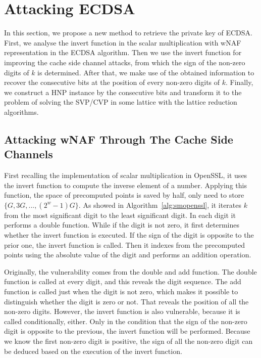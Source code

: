 \section{Attacking ECDSA}
\label{sec:attack}
In this section, we propose a new method to retrieve the private key of ECDSA.
First, we analyse the invert function in the scalar multiplication with wNAF representation in the ECDSA algorithm.
 Then we use the invert function for improving the cache side channel attacks, from which the sign of the non-zero digits of $k$ is determined.
After that, we make use of the obtained information to recover the consecutive bits at the position of every non-zero digits of $k$.
Finally, we construct a HNP instance by the consecutive bits and transform it to the problem of solving the SVP/CVP in some lattice with the lattice reduction algorithms.

\subsection{Attacking wNAF Through The Cache Side Channels}
\label{data_get}
First recalling the implementation of scalar multiplication in OpenSSL, it uses the invert function to 
  compute the inverse element of a number.
Applying this function, the space of precomputed points is saved by half, only need to store $\{G, 3G, ..., (2^{w} - 1)G\}$.
As showed in Algorithm~\ref{alg:smopenssl},
it iterates $k$ from the most significant digit to the least significant digit.
In each digit it performs a double function.
While if the digit is not zero, it first determines whether the invert function is executed.
 If the sign of the digit is opposite to the prior one, the invert function is called.
Then it indexes from the precomputed points using the absolute value of the digit and performs an addition operation.

Originally, the vulnerability comes from the double and add function.
The double function is called at every digit, and this reveals the digit sequence.
The add function is called just when the digit is not zero,
  which makes it possible to distinguish whether the digit is zero or not.
  That reveals the position of all the non-zero digits.
However,
 the invert function is also vulnerable, because it is called conditionally, either.
Only in the condition that the sign of the non-zero digit is opposite to the previous, the invert function will be performed.
Because we know the first non-zero digit is positive, 
   the sign of all the non-zero digit can be deduced based on the execution of the invert function. 


